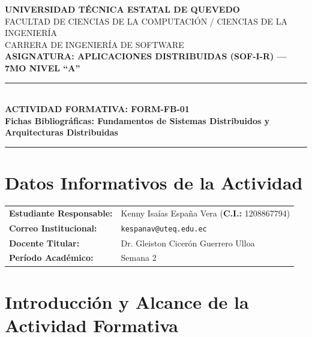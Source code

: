 \documentclass[11pt,a4paper]{article}
\begin{document}
\begin{center}
    {\large\bfseries UNIVERSIDAD TÉCNICA ESTATAL DE QUEVEDO}\\[0.2em]
    {\normalsize FACULTAD DE CIENCIAS DE LA COMPUTACIÓN / CIENCIAS DE LA INGENIERÍA}\\[0.1em]
    {\normalsize CARRERA DE INGENIERÍA DE SOFTWARE}\\[0.25em]
    {\bfseries ASIGNATURA: APLICACIONES DISTRIBUIDAS (SOF-I-R) --- 7MO NIVEL ``A''}\\[0.4em]
    \rule{\textwidth}{1.2pt}\\[0.3em]
    {\Large\bfseries ACTIVIDAD FORMATIVA: FORM-FB-01}\\[0.2em]
    {\large\bfseries Fichas Bibliográficas: Fundamentos de Sistemas Distribuidos y Arquitecturas Distribuidas}\\[0.2em]
    \rule{\textwidth}{1.2pt}
\end{center}

\vspace{0.2em}

\section{Datos Informativos de la Actividad}

\begin{table}[h!]
\normalsize
\renewcommand{\arraystretch}{1.15}
\begin{tabularx}{\textwidth}{@{}lX@{}}
\toprule
\textbf{Estudiante Responsable:} & Kenny Isaías España Vera \quad (\textbf{C.I.:} 1208867794) \\
\textbf{Correo Institucional:} & \texttt{kespanav@uteq.edu.ec} \\
\textbf{Docente Titular:} & Dr. Gleiston Cicerón Guerrero Ulloa \\
\textbf{Período Académico:} & Semana 2 \\
\bottomrule
\end{tabularx}
\end{table}

\vspace{0.4em}

\section{Introducción y Alcance de la Actividad Formativa}
\end{document}
